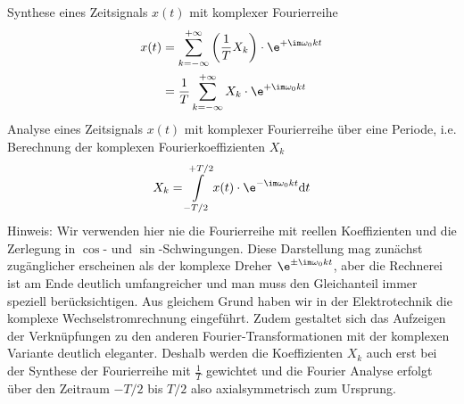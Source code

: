 \begin{Werkzeug}
Synthese eines Zeitsignals $x(t)$ mit komplexer Fourierreihe
%
\begin{align}
x(t)
&= \sum\limits_{k=-\infty}^{+\infty} \left(\frac{1}{T} X_k\right) \cdot \e^{+\im \omega_0 k t}\\
&= \frac{1}{T}\sum\limits_{k=-\infty}^{+\infty} X_k \cdot \e^{+\im \omega_0 k t}
\end{align}
%
Analyse eines Zeitsignals $x(t)$ mit komplexer Fourierreihe über eine Periode, i.e.
Berechnung der komplexen Fourierkoeffizienten $X_k$
\begin{equation}
X_k =  \int\limits_{-T/2}^{+T/2} x(t) \cdot \e^{-\im \omega_0 k t} \mathrm{d}t
\end{equation}
%
Hinweis: Wir verwenden hier nie die Fourierreihe mit
reellen Koeffizienten und die Zerlegung in $\cos$- und $\sin$-Schwingungen.
%
Diese Darstellung mag zunächst zugänglicher erscheinen als der komplexe
Dreher $\e^{\pm\im \omega_0 k t}$, aber die Rechnerei ist am Ende deutlich
umfangreicher und man muss den Gleichanteil immer speziell berücksichtigen.
%
Aus gleichem Grund haben wir in der Elektrotechnik die komplexe
Wechselstromrechnung eingeführt.
%
Zudem gestaltet sich das Aufzeigen der Verknüpfungen zu den anderen
Fourier-Transformationen mit der komplexen Variante deutlich eleganter.
%
Deshalb werden die Koeffizienten $X_k$ auch erst bei der Synthese der
Fourierreihe mit $\frac{1}{T}$ gewichtet und die Fourier Analyse erfolgt über
den Zeitraum $-T/2$ bis $T/2$ also axialsymmetrisch zum Ursprung.
\end{Werkzeug}

